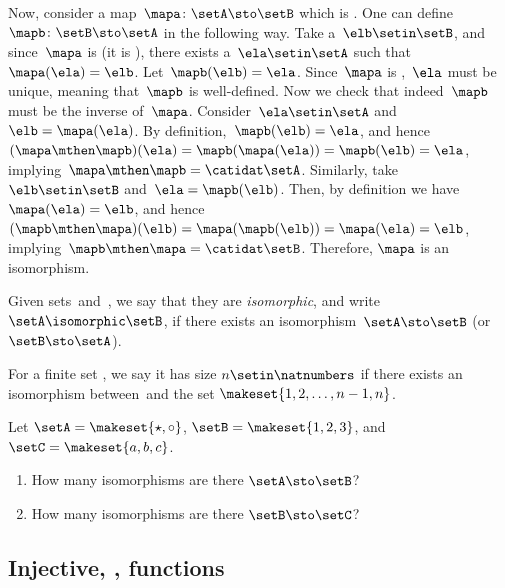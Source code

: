 \begin{solution}
    Now, consider a map~$\mapa\colon \setA \sto \setB$ which is .
    One can define~$\mapb\colon \setB \sto \setA$ in the following way.
    Take a~$\elb\setin\setB$, and since~$\mapa$ is  (it is ), there exists a~$\ela\setin\setA$ such that~$\mapa(\ela)=\elb$.
    Let~$\mapb(\elb)=\ela$.
    Since~$\mapa$ is ,~$\ela$ must be unique, meaning that~$\mapb$ is well-defined.
    Now we check that indeed~$\mapb$ must be the inverse of~$\mapa$.
    Consider~$\ela \setin\setA$ and~$\elb=\mapa(\ela)$.
    By definition,~$\mapb(\elb)=\ela$, and hence~$(\mapa\mthen \mapb)(\ela)=\mapb(\mapa(\ela))=\mapb(\elb)=\ela$, implying~$\mapa\mthen \mapb=\catidat\setA$.
    Similarly, take~$\elb\setin\setB$ and~$\ela=\mapb(\elb)$.
    Then, by definition we have~$\mapa(\ela)=\elb$, and hence~$(\mapb\mthen \mapa)(\elb)=\mapa(\mapb(\elb))=\mapa(\ela)=\elb$, implying~$\mapb\mthen \mapa=\catidat\setB$.
    Therefore, $\mapa$ is an isomorphism.
\end{solution}

\begin{ctdefinition}\label{def:set-isomorphic}
    Given sets~\setA and~\setB, we say that they are \emph{isomorphic}, and write~$\setA \isomorphic \setB$,
    if there exists an isomorphism~$\setA \sto \setB$ (or~$\setB \sto \setA$).
\end{ctdefinition}

For a finite set \setA, we say it has size $n \setin \natnumbers$ if there exists an isomorphism between~\setA and the set $\makeset{1,2, \dots, n-1, n}$.

\begin{gradedexercise}
    \label{ex:CountingIsos}

    Let $\setA = \makeset{{{\star}}, {{\circ}} }$, $\setB = \makeset{1, 2, 3}$, and $\setC = \makeset{a, b, c}$.
    \begin{enumerate}
        \item How many isomorphisms are there $\setA \sto \setB$?
        \item How many isomorphisms are there $\setB \sto \setC$?
    \end{enumerate}
\end{gradedexercise}



\subsection{Injective, ,  functions}
\label{sub:injective-and-surjective}

